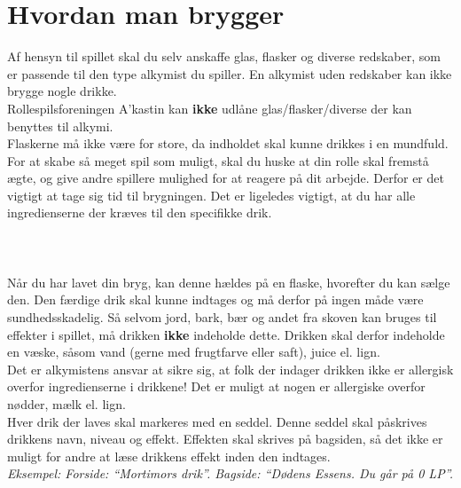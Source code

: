 \section{Hvordan man brygger}
Af hensyn til spillet skal du selv anskaffe glas, flasker og diverse redskaber, som er passende til den type alkymist du spiller. En alkymist uden redskaber kan ikke brygge nogle drikke.\\
Rollespilsforeningen A’kastin kan \textbf{ikke} udlåne glas/flasker/diverse der kan benyttes til alkymi.\\
Flaskerne må ikke være for store, da indholdet skal kunne drikkes i en mundfuld.\\
For at skabe så meget spil som muligt, skal du huske at din rolle skal fremstå ægte, og give andre spillere mulighed for at reagere på dit arbejde. Derfor er det vigtigt at tage sig tid til brygningen. Det er ligeledes vigtigt, at du har alle ingredienserne der kræves til den specifikke drik.\\
\\\\\\
Når du har lavet din bryg, kan denne hældes på en flaske, hvorefter du kan sælge den. Den færdige drik skal kunne indtages og må derfor på ingen måde være sundhedsskadelig. Så selvom jord, bark, bær og andet fra skoven kan bruges til effekter i spillet, må drikken \textbf{ikke} indeholde dette. Drikken skal derfor indeholde en væske, såsom vand (gerne med frugtfarve eller saft), juice el. lign.\\
Det er alkymistens ansvar at sikre sig, at folk der indager drikken ikke er allergisk overfor ingredienserne i drikkene! Det er muligt at nogen er allergiske overfor nødder, mælk el. lign.\\
Hver drik der laves skal markeres med en seddel. Denne seddel skal påskrives drikkens navn, niveau og effekt. Effekten skal skrives på bagsiden, så det ikke er muligt for andre at læse drikkens effekt inden den indtages.\\

\emph{Eksempel: Forside: “Mortimors drik”. Bagside: “Dødens Essens. Du går på 0 LP”.}

